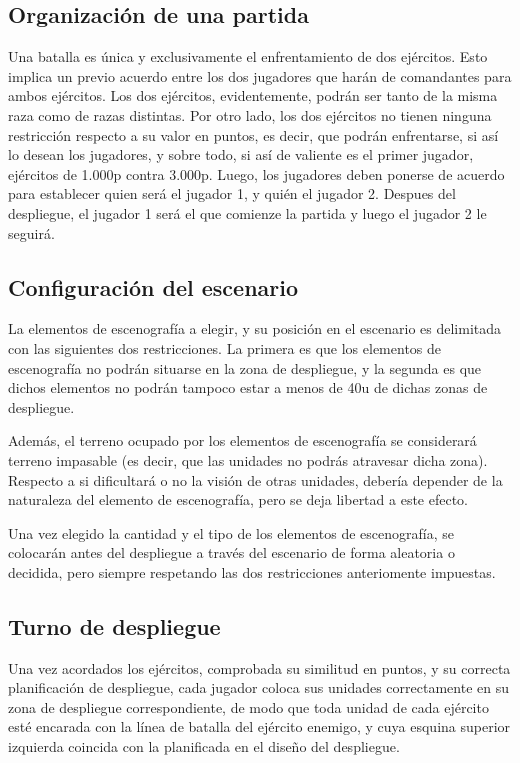 \subsection*{Organización de una partida}
\label{organizacionpartida}
Una batalla es única y exclusivamente el enfrentamiento de dos
ejércitos. Esto implica un previo acuerdo entre los dos jugadores que
harán de comandantes para ambos ejércitos. Los dos ejércitos,
evidentemente, podrán ser tanto de la misma raza como de razas
distintas. Por otro lado, los dos ejércitos no tienen ninguna
restricción respecto a su valor en puntos, es decir, que podrán
enfrentarse, si así lo desean los jugadores, y sobre todo, si así de
valiente es el primer jugador, ejércitos de 1.000p contra
3.000p. Luego, los jugadores deben ponerse de acuerdo para establecer
quien será el jugador 1, y quién el jugador 2. Despues del despliegue,
el jugador 1 será el que comienze la partida y luego el jugador 2 le seguirá.

\subsection*{Configuración del escenario}
\label{escenario}
La elementos de escenografía a elegir, y su posición en el escenario
es delimitada con las siguientes dos restricciones. La primera es que
los elementos de escenografía no podrán situarse en la zona de
despliegue, y la segunda es que dichos elementos no podrán tampoco
estar a menos de 40u de dichas zonas de despliegue.

Además, el terreno ocupado por los elementos de escenografía se considerará
terreno impasable (es decir, que las unidades no podrás atravesar
dicha zona). Respecto a si dificultará o no la visión de otras unidades,
debería depender de la naturaleza del elemento de escenografía, pero se deja libertad a este efecto. 

Una vez elegido la cantidad y el tipo de los elementos de
escenografía, se colocarán antes del despliegue a través del escenario de forma aleatoria o
decidida, pero siempre respetando las dos restricciones anteriomente impuestas.

\subsection*{Turno de despliegue}
\label{despliegue}
Una vez acordados los ejércitos, comprobada su similitud en puntos, y
su correcta planificación de despliegue, cada jugador coloca sus
unidades correctamente en su zona de despliegue correspondiente, de
modo que toda unidad de cada ejército esté encarada con la línea de
batalla del ejército enemigo, y cuya esquina superior izquierda
coincida con la planificada en el diseño del despliegue.

